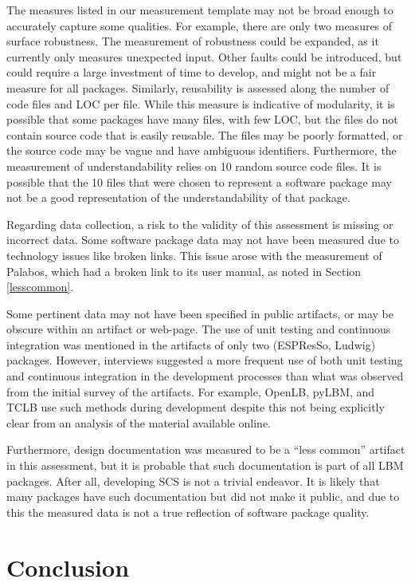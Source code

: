\documentclass[12pt, notitlepage]{article}
\begin{document}
The measures listed in our measurement template may not be broad enough to accurately capture some qualities. For example, there are only two measures of surface robustness. The measurement of robustness could be expanded, as it currently only measures unexpected input. Other faults could be introduced, but could require a large investment of time to develop, and might not be a fair measure for all packages. Similarly, reusability is assessed along the number of code files and LOC per file. While this measure is indicative of modularity, it is possible that some packages have many files, with few LOC, but the files do not contain source code that is easily reusable. The files may be poorly formatted, or the source code may be vague and have ambiguous identifiers. Furthermore, the measurement of understandability relies on 10 random source code files. It is possible that the 10 files that were chosen to represent a software package may not be a good representation of the understandability of that package.

Regarding data collection, a risk to the validity of this assessment is missing or incorrect data. Some software package data may not have been measured due to technology issues like broken links. This issue arose with the measurement of Palabos, which had a broken link to its user manual, as noted in Section \ref{lesscommon}. 

Some pertinent data may not have been specified in public artifacts, or may be obscure within an artifact or web-page. The use of unit testing and continuous integration was mentioned in the artifacts of only two (ESPResSo, Ludwig) packages. However, interviews suggested a more frequent use of both unit testing and continuous integration in the development processes than what was observed from the initial survey of the artifacts. For example, OpenLB, pyLBM, and TCLB use such methods during development despite this not being explicitly clear from an analysis of the material available online. 

Furthermore, design documentation was measured to be a ``less common'' artifact in this assessment, but it is probable that such documentation is part of all LBM packages. After all, developing SCS is not a trivial endeavor. It is likely that many packages have such documentation but did not make it public, and due to this the measured data is not a true reflection of software package quality.

\newpage
\section{Conclusion}\label{conclusion}
\end{document}
